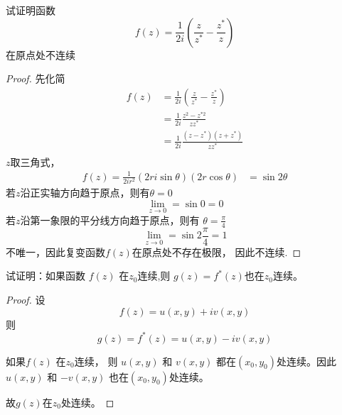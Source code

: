 \begin{example}
    试证明函数
    \[ f(z) = \frac{1}{2i} \left(\frac{z}{z^*} - \frac{z^*}{z} \right)\]
    在原点处不连续
\end{example}
\begin{proof} 先化简
    \[ \begin{aligned}
      f(z) &= \frac{1}{2i} \left(\frac{z}{z^*} - \frac{z^*}{z} \right)\\
      &=  \frac{1}{2i}  \frac{z^2 - z^{*2} }{zz^* } \\
      &=  \frac{1}{2i}  \frac{(z- z^{*}) (z+z^{*})  }{zz^* } \\
    \end{aligned}\]   
    $z$取三角式，
    \[ \begin{aligned}
        f(z) = \frac{1}{2i r^2} (2r i \sin \theta) (2r \cos \theta) 
        &= \sin  2 \theta
      \end{aligned} \]  
      若$z$沿正实轴方向趋于原点，则有$\theta = 0$ 
      \[ \lim_{z \to 0} = \sin 0 = 0\]
      若$z$沿第一象限的平分线方向趋于原点，则有 $\theta = \frac{\pi}{4}$
      \[ \lim_{z \to 0} = \sin  2  \frac{\pi}{4} = 1\]
      不唯一，因此复变函数$f(z)$在原点处不存在极限， 因此不连续.  
\end{proof}

\begin{example}
    试证明：如果函数 $f(z) $ 在$z_0$连续,则 $g(z) = f^*(z)$也在$z_0$连续。
\end{example}
\begin{proof} 
    设 $$f(z) = u(x,y) + iv(x,y)$$则 $$g(z) =f^*(z) = u(x,y) - iv(x,y)$$ 
    
    如果$f(z) $ 在$z_0$连续， 则 $u(x,y)$ 和 $v(x,y)$ 都在$(x_0, y_0)$处连续。因此$u(x,y)$ 和 $-v(x,y)$ 也在$(x_0, y_0)$处连续。
    
    故$g(z)$在$z_0$处连续。
\end{proof}

